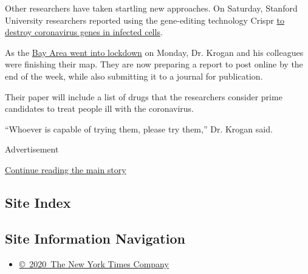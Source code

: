 Other researchers have taken startling new approaches. On Saturday,
Stanford University researchers reported using the gene-editing
technology Crispr
\href{https://www.biorxiv.org/content/10.1101/2020.03.13.991307v1}{to
destroy coronavirus genes in infected cells}.

As the
\href{https://www.nytimes3xbfgragh.onion/2020/03/17/us/shelter-in-place-order-bay-area.html}{Bay
Area went into lockdown} on Monday, Dr. Krogan and his colleagues were
finishing their map. They are now preparing a report to post online by
the end of the week, while also submitting it to a journal for
publication.

Their paper will include a list of drugs that the researchers consider
prime candidates to treat people ill with the coronavirus.

``Whoever is capable of trying them, please try them,'' Dr. Krogan said.

Advertisement

\protect\hyperlink{after-bottom}{Continue reading the main story}

\hypertarget{site-index}{%
\subsection{Site Index}\label{site-index}}

\hypertarget{site-information-navigation}{%
\subsection{Site Information
Navigation}\label{site-information-navigation}}

\begin{itemize}
\tightlist
\item
  \href{https://help.nytimes3xbfgragh.onion/hc/en-us/articles/115014792127-Copyright-notice}{©~2020~The
  New York Times Company}
\end{itemize}

